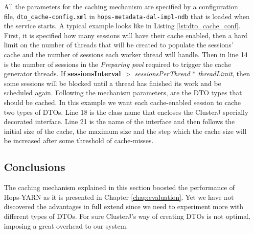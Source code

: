 

All the parameters for the caching mechanism are specified by a
configuration file, \texttt{dto\_cache-config.xml} in
\texttt{hops-metadata-dal-impl-ndb} that is loaded when
the service starts. A typical example looks like in Listing
\ref{lst:dto_cache_conf}. First, it is specified how many sessions
will have their cache enabled, then a hard limit on the number
of threads that will be created to populate the sessions' cache and
the number of sessions each worker thread will handle. Then in line 14
is the number of sessions in the \emph{Preparing pool} required to
trigger the cache generator threads. If \textbf{sessionsInterval}
$>$ \emph{sessionsPerThread} $*$ \emph{threadLimit}, then some
sessions will be blocked until a thread has finished its work and be
scheduled again. Following the mechanism parameters, are the DTO types
that should be cached. In this example we want each cache-enabled
session to cache two types of DTOs. Line 18 is the class name that
encloses the ClusterJ specially decorated interface. Line 21 is the
name of the interface and then follows the initial size of the cache,
the maximum size and the step which the cache size will be increased after some
threshold of cache-misses.

\subsection{Conclusions}
\label{ssec:impl_dto_caching_conslusions}
The caching mechanism explained in this section boosted the
performance of Hops-YARN as it is presented in Chapter \ref{chap:evaluation}. Yet
we have not discovered the advantages in full extend since we need to
experiment more with different types of DTOs. For sure ClusterJ's way
of creating DTOs is not optimal, imposing a great overhead to our system.